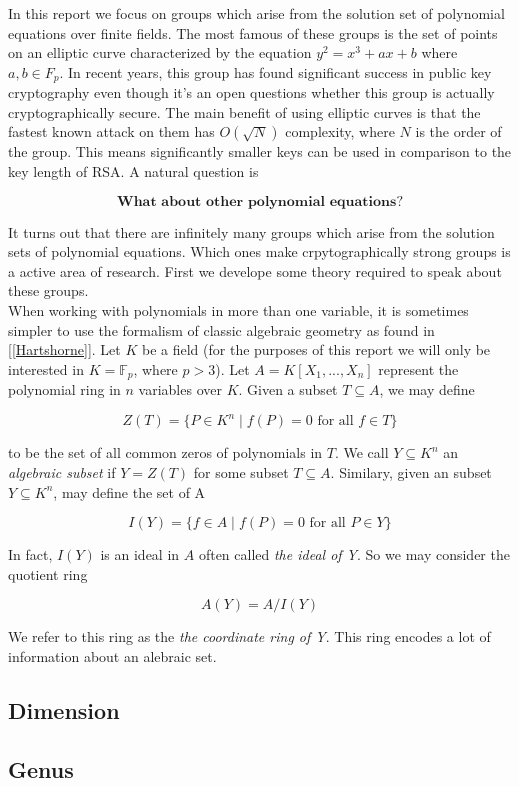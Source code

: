 


In this report we focus on groups which arise from the solution set of polynomial equations over finite fields. The most famous of these groups is the set of points on an elliptic curve characterized by the equation $y^2 = x^3 + ax + b$ where $a,b \in F_p$. In recent years, this group has found significant success in public key cryptography even though it's an open questions whether this group is actually cryptographically secure. The main benefit of using elliptic curves is that the fastest known attack on them has $O(\sqrt{N})$ complexity, where $N$ is the order of the group. This means significantly smaller keys can be used in comparison to the key length of RSA. A natural question is 

$$
\textbf{What about other polynomial equations?}
$$ 

It turns out that there are infinitely many groups which arise from the solution sets of polynomial equations. Which ones make crpytographically strong groups is a active area of research. First we develope some theory required to speak about these groups. \\ 

When working with polynomials in more than one variable, it is sometimes simpler to use the formalism of classic algebraic geometry as found in [\ref{Hartshorne}]. Let $K$ be a field (for the purposes of this report we will only be interested in $K = \mathbb{F}_p$, where $p>3$). Let $A = K[X_1,...,X_n]$ represent the polynomial ring in $n$ variables over $K$. Given a subset $T \subseteq A $, we may define 

$$
Z(T) = \lbrace P \in K^n \mid f(P) = 0 \text{ for all } f \in T \rbrace 
$$ 

to be the set of all common zeros of polynomials in $T$. We call $Y \subseteq K^n $ an \textit{algebraic subset} if $Y = Z(T)$ for some subset $T \subseteq A$. Similary, given an subset $Y \subseteq K^n$, may define the set of A 

$$ 
I(Y) = \lbrace f \in A \mid f(P) = 0 \text { for all } P \in Y \rbrace 
$$ 

In fact, $I(Y)$ is an ideal in $A$ often called \textit{the ideal of Y}. So we may consider the quotient ring 

$$
A(Y) = A / I(Y) 
$$ 

We refer to this ring as the \textit{the coordinate ring of Y}. This ring encodes a lot of information about an alebraic set. 



\subsection{Dimension}
\subsection{Genus}


